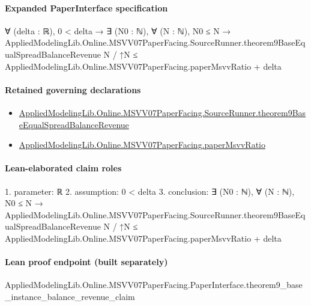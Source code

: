 \documentclass[10pt]{article}
\begin{document}
\paragraph{Expanded PaperInterface specification}
\begin{ReviewVerbatim}
∀ (delta : ℝ),
  0 < delta →
    ∃ (N0 : ℕ),
      ∀ (N : ℕ),
        N0 ≤ N →
          AppliedModelingLib.Online.MSVV07PaperFacing.SourceRunner.theorem9BaseEqualSpreadBalanceRevenue N / ↑N ≤
            AppliedModelingLib.Online.MSVV07PaperFacing.paperMsvvRatio + delta
\end{ReviewVerbatim}

\paragraph{Retained governing declarations}
\begin{itemize}\raggedright
\item \hyperlink{governing-declaration-ec99f88bbb092f95}{Applied\allowbreak{}Modeling\allowbreak{}Lib.\allowbreak{}Online.\allowbreak{}MSVV07\allowbreak{}Paper\allowbreak{}Facing.\allowbreak{}Source\allowbreak{}Runner.\allowbreak{}theorem9\allowbreak{}Base\allowbreak{}Equal\allowbreak{}Spread\allowbreak{}Balance\allowbreak{}Revenue}
\item \hyperlink{governing-declaration-11865634591d1a39}{Applied\allowbreak{}Modeling\allowbreak{}Lib.\allowbreak{}Online.\allowbreak{}MSVV07\allowbreak{}Paper\allowbreak{}Facing.\allowbreak{}paper\allowbreak{}Msvv\allowbreak{}Ratio}
\end{itemize}
\paragraph{Lean-elaborated claim roles}\begin{ReviewVerbatim}
1. parameter: ℝ
2. assumption: 0 < delta
3. conclusion: ∃ (N0 : ℕ),
  ∀ (N : ℕ),
    N0 ≤ N →
      AppliedModelingLib.Online.MSVV07PaperFacing.SourceRunner.theorem9BaseEqualSpreadBalanceRevenue N / ↑N ≤
        AppliedModelingLib.Online.MSVV07PaperFacing.paperMsvvRatio + delta
\end{ReviewVerbatim}

\paragraph{Lean proof endpoint (built separately)}\begin{ReviewVerbatim}
AppliedModelingLib.Online.MSVV07PaperFacing.PaperInterface.theorem9_base_instance_balance_revenue_claim
\end{ReviewVerbatim}
\end{document}
